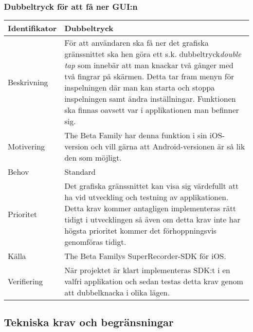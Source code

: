 \subsubsection{Dubbeltryck för att få ner GUI:n}
\begin{tabular}{ | p{65pt} | p{300pt} |}
  \hline
  Identifikator &
  Dubbeltryck
  \\ \hline
  Beskrivning & 
  För att användaren ska få ner det grafiska gränssnittet ska hen göra ett s.k. dubbeltryck\emph{double tap} som innebär att man knackar två gånger med två fingrar på skärmen. Detta tar fram menyn för inspelningen där man kan starta och stoppa inspelningen samt ändra inställningar. Funktionen ska finnas oavsett var i applikationen man befinner sig.
  \\ \hline
  Motivering &
  The Beta Family har denna funktion i sin iOS-version och vill gärna att Android-versionen är så lik den som möjligt.
  \\ \hline
  Behov &
  Standard
  \\ \hline
  Prioritet &
  Det grafiska gränssnittet kan visa sig värdefullt att ha vid utveckling och testning av applikationen. Detta krav kommer antagligen implementeras rätt tidigt i utvecklingen så även om detta krav inte har högsta prioritet kommer det förhoppningsvis genomföras tidigt.
  \\ \hline
  Källa &
  The Beta Familys SuperRecorder-SDK för iOS.
  \\ \hline
  Verifiering &
När projektet är klart implementeras SDK:t i en valfri applikation och sedan testas detta krav genom att dubbelknacka i olika lägen.
  \\ \hline
  \end{tabular}

\subsection{Tekniska krav och begränsningar}
\label{subsec:techreq}


